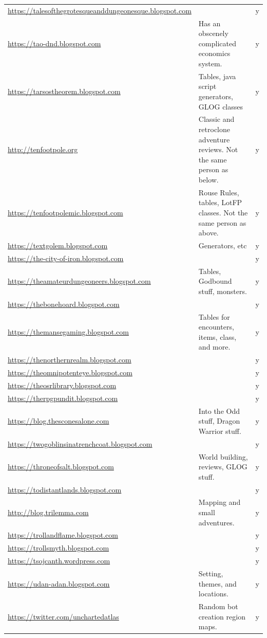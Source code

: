\documentclass[a4paper, 11pt, twoside]{article}
\begin{document}
\begin{longtable}{p{6cm}p{8cm}c}
\url{https://talesofthegrotesqueanddungeonesque.blogspot.com} &  & y\\
\url{https://tao-dnd.blogspot.com} & Has an obscenely complicated economics system. & y\\
\url{https://tarsostheorem.blogspot.com} & Tables, java script generators, GLOG classes & y\\
\url{http://tenfootpole.org} & Classic and retroclone adventure reviews. Not the same person as below. & y\\
\url{https://tenfootpolemic.blogspot.com} & Rouse Rules, tables, LotFP classes. Not the same person as above. & y\\
\url{https://textgolem.blogspot.com} & Generators, etc & y\\
\url{https://the-city-of-iron.blogspot.com} &  & y\\
\url{https://theamateurdungeoneers.blogspot.com} & Tables, Godbound stuff, monsters. & y\\
\url{https://thebonehoard.blogspot.com} &  & y\\
\url{https://themansegaming.blogspot.com} & Tables for encounters, items, class, and more. & y\\
\url{https://thenorthernrealm.blogspot.com} &  & y\\
\url{https://theomnipotenteye.blogspot.com} &  & y\\
\url{https://theosrlibrary.blogspot.com} &  & y\\
\url{https://therpgpundit.blogspot.com} &  & y\\
\url{https://blog.thesconesalone.com} & Into the Odd stuff, Dragon Warrior stuff. & y\\
\url{https://twogoblinsinatrenchcoat.blogspot.com} &  & y\\
\url{https://throneofsalt.blogspot.com} & World building, reviews, GLOG stuff. & y\\
\url{https://todistantlands.blogspot.com} &  & y\\
\url{http://blog.trilemma.com} & Mapping and small adventures. & y\\
\url{https://trollandflame.blogspot.com} &  & y\\
\url{https://trollsmyth.blogspot.com} &  & y\\
\url{https://tsojcanth.wordpress.com} &  & y\\
\url{https://udan-adan.blogspot.com} & Setting, themes, and locations. & y\\
\url{https://twitter.com/unchartedatlas} & Random bot creation region maps. & y\\

\end{longtable}
\end{document}

